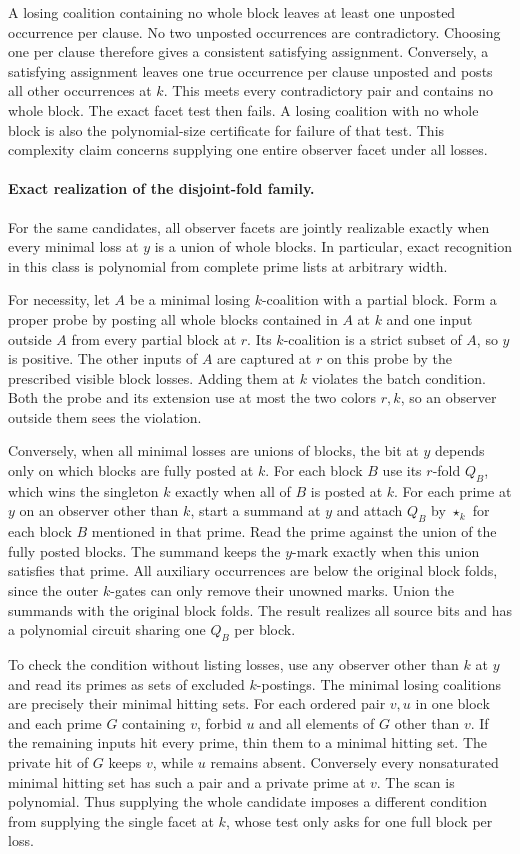 A losing coalition containing no whole block
leaves at least one unposted occurrence per clause.
No two unposted occurrences are contradictory.
Choosing one per clause therefore gives a consistent
satisfying assignment. Conversely, a satisfying
assignment leaves one true occurrence per clause
unposted and posts all other occurrences at $k$.
This meets every contradictory pair and contains
no whole block. The exact facet test then fails.
A losing coalition with no whole block is also
the polynomial-size certificate for failure of
that test. This complexity claim concerns supplying
one entire observer facet under all losses.

\paragraph{Exact realization of the disjoint-fold family.}
For the same candidates, all observer facets are
jointly realizable exactly when every minimal loss
at $y$ is a union of whole blocks. In particular,
exact recognition in this class is polynomial from
complete prime lists at arbitrary width.

For necessity, let $A$ be a minimal losing
$k$-coalition with a partial block. Form a proper
probe by posting all whole blocks contained in $A$
at $k$ and one input outside $A$ from every partial
block at $r$. Its $k$-coalition is a strict subset
of $A$, so $y$ is positive. The other inputs of
$A$ are captured at $r$ on this probe by the
prescribed visible block losses. Adding them at
$k$ violates the batch condition. Both the probe
and its extension use at most the two colors
$r,k$, so an observer outside them sees the
violation.

Conversely, when all minimal losses are unions
of blocks, the bit at $y$ depends only on which
blocks are fully posted at $k$. For each block
$B$ use its $r$-fold $Q_B$, which wins the
singleton $k$ exactly when all of $B$ is posted
at $k$. For each prime at $y$ on an observer
other than $k$, start a summand at $y$ and
attach $Q_B$ by $\star_k$ for each block $B$
mentioned in that prime. Read the prime against
the union of the fully posted blocks. The
summand keeps the $y$-mark exactly when this
union satisfies that prime. All auxiliary
occurrences are below the original block
folds, since the outer $k$-gates can only
remove their unowned marks. Union the summands
with the original block folds. The result
realizes all source bits and has a polynomial
circuit sharing one $Q_B$ per block.

To check the condition without listing losses,
use any observer other than $k$ at $y$ and read
its primes as sets of excluded $k$-postings.
The minimal losing coalitions are precisely
their minimal hitting sets. For each ordered pair
$v,u$ in one block and each prime $G$ containing
$v$, forbid $u$ and all elements of $G$ other
than $v$. If the remaining inputs hit every
prime, thin them to a minimal hitting set.
The private hit of $G$ keeps $v$, while $u$
remains absent. Conversely every nonsaturated
minimal hitting set has such a pair and a
private prime at $v$. The scan is polynomial.
Thus supplying the whole candidate imposes a
different condition from supplying the single
facet at $k$, whose test only asks for one
full block per loss.

